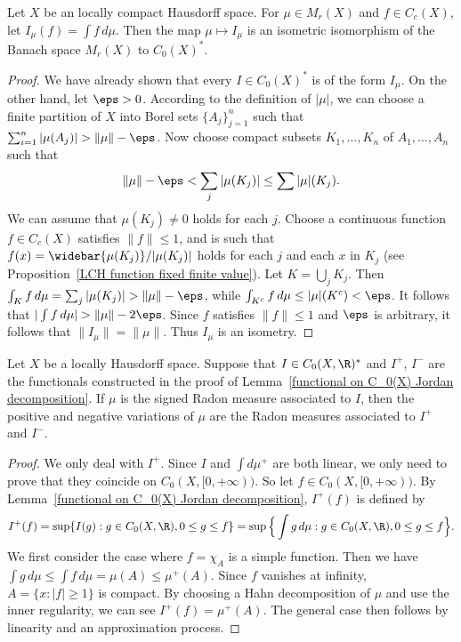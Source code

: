 \begin{theorem}
Let $X$ be an locally compact Hausdorff space. For $\mu\in M_r(X)$ and $f\in C_c(X)$, let $I_\mu(f)=\int f\,d\mu$. Then the map $\mu\mapsto I_\mu$ is an isometric isomorphism of the Banach space $M_r(X)$ to $C_0(X)^*$.
\end{theorem}
\begin{proof}
We have already shown that every $I\in C_0(X)^*$ is of the form $I_\mu$. On the other hand, let $\eps>0$. According to the definition of $|\mu|$, we can choose a finite partition of $X$ into Borel sets $\{A_j\}_{j=1}^{n}$ such that $\sum_{i=1}^{n}|\mu(A_j)|>\|\mu\|-\eps$. Now choose compact subsets $K_1,\dots,K_n$ of $A_1,\dots,A_n$ such that
\[\|\mu\|-\eps<\sum_j|\mu(K_j)|\leq\sum|\mu|(K_j).\]
We can assume that $\mu(K_j)\neq 0$ holds for each $j$. Choose a continuous function $f\in C_c(X)$ satisfies $\|f\|\leq 1$, and is such that $f(x)=\widebar{\mu(K_j)}/|\mu(K_j)|$ holds for each $j$ and each $x$ in $K_j$ (see Proposition~\ref{LCH function fixed finite value}). Let $K=\bigcup_jK_j$. Then $\int_Kf\,d\mu=\sum_j|\mu(K_j)|>\|\mu\|-\eps$, while $\int_{K^c}f\,d\mu\leq|\mu|(K^c)<\eps$. It follows that $|\int f\,d\mu|>\|\mu\|-2\eps$. Since $f$ satisfies $\|f\|\leq 1$ and $\eps$ is arbitrary, it follows that $\|I_\mu\|=\|\mu\|$. Thus $I_\mu$ is an isometry.
\end{proof}
\begin{proposition}
Let $X$ be a locally Hausdorff space. Suppose that $I\in C_0(X,\R)^*$ and $I^+$, $I^-$ are the functionals constructed in the proof of Lemma~\ref{functional on C_0(X) Jordan decomposition}. If $\mu$ is the signed Radon measure associated to $I$, then the positive and negative variations of $\mu$ are the Radon measures associated to $I^+$ and $I^-$.
\end{proposition}
\begin{proof}
We only deal with $I^+$. Since $I$ and $\int d\mu^+$ are both linear, we only need to prove that they coincide on $C_0(X,[0,+\infty))$. So let $f\in C_0(X,[0,+\infty))$. By Lemma~\ref{functional on C_0(X) Jordan decomposition}, $I^+(f)$ is defined by
\[I^+(f)=\sup\{I(g):g\in C_0(X,\R),0\leq g\leq f\}=\sup\Big\{\int g\,d\mu:g\in C_0(X,\R),0\leq g\leq f\Big\}.\]
We first consider the case where $f=\chi_A$ is a simple function. Then we have $\int g\,d\mu\leq\int f\,d\mu=\mu(A)\leq\mu^+(A)$. Since $f$ vanishes at infinity, $A=\{x:|f|\geq 1\}$ is compact. By choosing a Hahn decomposition of $\mu$ and use the inner regularity, we can see $I^+(f)=\mu^+(A)$. The general case then follows by linearity and an approximation process.
\end{proof}
